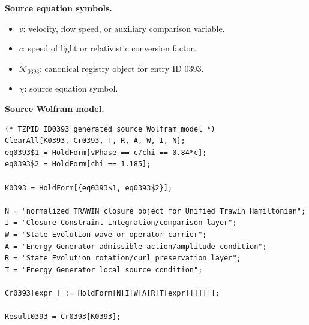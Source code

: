 \begin{minipage}[t]{0.49\linewidth}
\begingroup
\small
\raggedright
\textbf{Source equation symbols.}\par
\begin{itemize}[leftmargin=1.35em,itemsep=1pt,topsep=1pt,parsep=0pt]
    \item $v$: velocity, flow speed, or auxiliary comparison variable.
    \item $c$: speed of light or relativistic conversion factor.
    \item $\mathcal{K}_{0393}$: canonical registry object for entry ID 0393.
    \item $\chi$: source equation symbol.
\end{itemize}
\endgroup
\end{minipage}\hfill
\begin{minipage}[t]{0.47\linewidth}
\begingroup
\scriptsize
\raggedright
\textbf{Source Wolfram model.}\par
\begin{Verbatim}[fontsize=\tiny,breaklines=true,breakanywhere=true]
(* TZPID ID0393 generated source Wolfram model *)
ClearAll[K0393, Cr0393, T, R, A, W, I, N];
eq0393$1 = HoldForm[vPhase == c/chi == 0.84*c];
eq0393$2 = HoldForm[chi == 1.185];

K0393 = HoldForm[{eq0393$1, eq0393$2}];

N = "normalized TRAWIN closure object for Unified Trawin Hamiltonian";
I = "Closure Constraint integration/comparison layer";
W = "State Evolution wave or operator carrier";
A = "Energy Generator admissible action/amplitude condition";
R = "State Evolution rotation/curl preservation layer";
T = "Energy Generator local source condition";

Cr0393[expr_] := HoldForm[N[I[W[A[R[T[expr]]]]]]];

Result0393 = Cr0393[K0393];
\end{Verbatim}
\endgroup
\end{minipage}

